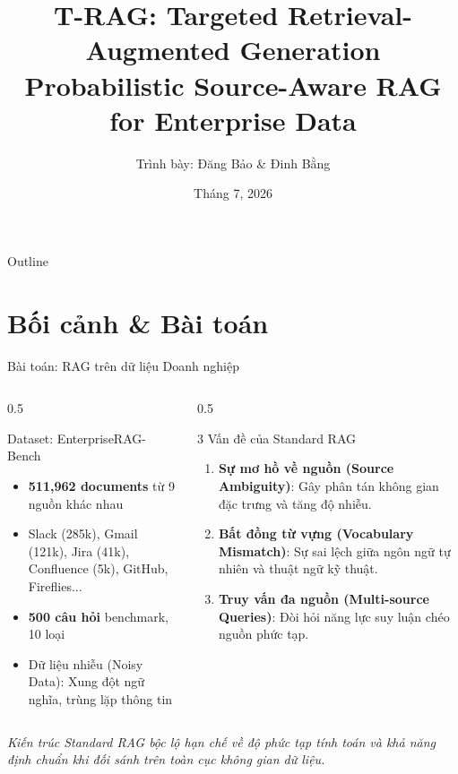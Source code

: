 \documentclass[aspectratio=169,11pt]{beamer}
\title[\textbf{T-RAG}]{\textbf{T-RAG: Targeted Retrieval-Augmented Generation}\\
\large Probabilistic Source-Aware RAG for Enterprise Data}
\author{Trình bày: Đăng Bảo \& Đinh Bằng}
\date{Tháng 7, 2026}
\institute{Research Proposal --- Advisor Meeting}
\begin{document}
\begin{frame}
\titlepage
\end{frame}

\begin{frame}{Outline}
\tableofcontents
\end{frame}

\section{Bối cảnh \& Bài toán}

\begin{frame}{Bài toán: RAG trên dữ liệu Doanh nghiệp}

\begin{columns}
\begin{column}{0.5\textwidth}
\begin{block}{Dataset: EnterpriseRAG-Bench}
\begin{itemize}
    \item \textbf{511,962 documents} từ 9 nguồn khác nhau
    \item Slack (285k), Gmail (121k), Jira (41k),\\Confluence (5k), GitHub, Fireflies...
    \item \textbf{500 câu hỏi} benchmark, 10 loại
    \item Dữ liệu nhiễu (Noisy Data): Xung đột ngữ nghĩa, trùng lặp thông tin
\end{itemize}
\end{block}
\end{column}
\begin{column}{0.5\textwidth}
\begin{alertblock}{3 Vấn đề của Standard RAG}
\begin{enumerate}
    \item \textbf{Sự mơ hồ về nguồn (Source Ambiguity)}: Gây phân tán không gian đặc trưng và tăng độ nhiễu.
    \item \textbf{Bất đồng từ vựng (Vocabulary Mismatch)}: Sự sai lệch giữa ngôn ngữ tự nhiên và thuật ngữ kỹ thuật.
    \item \textbf{Truy vấn đa nguồn (Multi-source Queries)}: Đòi hỏi năng lực suy luận chéo nguồn phức tạp.
\end{enumerate}
\end{alertblock}
\end{column}
\end{columns}

\vspace{0.4cm}
\begin{center}
\textit{Kiến trúc Standard RAG bộc lộ hạn chế về độ phức tạp tính toán và khả năng định chuẩn khi đối sánh trên toàn cục không gian dữ liệu.}
\end{center}
\end{frame}
\end{document}
